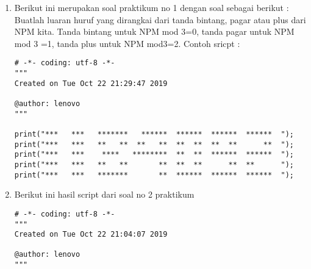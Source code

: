 \begin{enumerate}
\item
Berikut ini merupakan soal praktikum no 1 dengan soal sebagai berikut : \\
Buatlah luaran huruf yang dirangkai dari tanda bintang, pagar atau plus dari NPM kita.
Tanda bintang untuk NPM mod 3=0, tanda pagar untuk NPM mod 3 =1, tanda plus untuk NPM mod3=2.
Contoh sricpt : 
\begin{verbatim}
# -*- coding: utf-8 -*-
"""
Created on Tue Oct 22 21:29:47 2019

@author: lenovo
"""

print("***   ***   *******   ******  ******  ******  ******  ");
print("***   ***   **   **  **   **  **  **  **  **      **  ");
print("***   ***    ****   ********  **  **  ******  ******  ");
print("***   ***   **   **       **  **  **      **  **      ");
print("***   ***   *******       **  ******  ******  ******  ");
\end{verbatim}
\item
Berikut ini hasil script dari soal no 2 praktikum
\begin{verbatim}
# -*- coding: utf-8 -*-
"""
Created on Tue Oct 22 21:04:07 2019

@author: lenovo
"""


\end{verbatim}
\end{enumerate}
